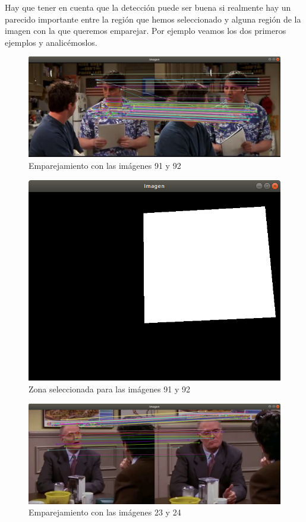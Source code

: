 \documentclass[12pt,a4paper]{article}
\begin{document}
\vspace{10px}

Hay que tener en cuenta que la detección puede ser buena si realmente hay un parecido importante entre la región que hemos seleccionado y alguna región de la imagen con la que queremos emparejar. Por ejemplo veamos los dos primeros ejemplos y analicémoslos.

\begin{figure}[H]
  \centering
	\includegraphics[scale=0.35]{./Imagenes/Ejercicio1-1.png}
	\caption{Emparejamiento con las imágenes 91 y 92}
\end{figure}

\begin{figure}[H]
	\centering
	\includegraphics[scale=0.3]{./Imagenes/Ejercicio1-mascara1.png}
	\caption{Zona seleccionada para las imágenes 91 y 92}
\end{figure}

\begin{figure}[H]
  \centering
  \includegraphics[scale=0.35]{./Imagenes/Ejercicio1-2.png}
  \caption{Emparejamiento con las imágenes 23 y 24}
\end{figure}
\end{document}
